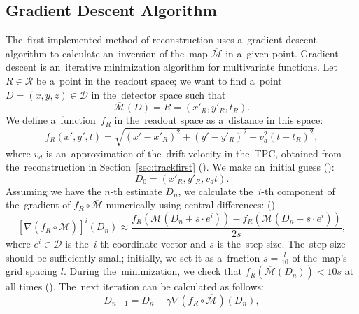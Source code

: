 		\subsection{Gradient Descent Algorithm}
		\label{sec:grad}			
			The~first implemented method of reconstruction uses a~gradient descent algorithm to calculate an~inversion of the~map $\overbar{\mathcal{M}}$ in a~given point. Gradient descent is an~iterative minimization algorithm for multivariate functions. Let $R\in\mathcal{R}$ be a~point in the~readout space; we want to find a~point $D = (x,y,z) \in\mathcal{D}$ in the~detector space such that 
				\begin{equation}
					\overbar{\mathcal{M}}(D) = R = (x'_R,y'_R,t_R).
				\end{equation}
			We define a~function~$f_R$ in the~readout space as a~distance in this space:
				\begin{equation}
					f_R(x',y',t) = \sqrt{(x'-x'_R)^2+(y'-y'_R)^2+v_d^2(t-t_R)^2},
				\end{equation}
			where $v_d$ is an~approximation of the~drift velocity in the~\ac{TPC}, obtained from the~reconstruction in Section~\ref{sec:trackfirst} (). We make an~initial guess ():
				\begin{equation}
					D_0 = (x'_R,y'_R,v_dt).
				\end{equation}
			Assuming we have the $n$-th estimate $D_n$, we calculate the~$i$-th component of the~gradient of $f_R\circ\overbar{\mathcal{M}}$ numerically using central differences: ()
				\begin{equation}
					\left[\nabla(f_R\circ\overbar{\mathcal{M}})\right]^i(D_n) \approx \frac{f_R(\overbar{\mathcal{M}}(D_n+s\cdot e^i))-f_R(\overbar{\mathcal{M}}(D_n-s\cdot e^i))}{2s},
				\end{equation}
			where $e^i\in\mathcal{D}$ is the~$i$-th coordinate vector and $s$ is the~step size. The~step size should be sufficiently small; initially, we set it as a~fraction $s = \frac{l}{10}$ of the~map's grid spacing $l$. During the~minimization, we check that $f_R(\overbar{\mathcal{M}}(D_n))<10s$ at all times ().  The~next iteration can be calculated as follows:
				\begin{equation}
					D_{n+1} = D_n - \gamma \nabla(f_R\circ\overbar{\mathcal{M}})(D_n),
				\end{equation}
